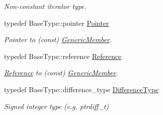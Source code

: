 \begin{DoxyCompactItemize}
\begin{DoxyCompactList}\small\item\em Non-\/constant iterator type. \end{DoxyCompactList}\item 
\mbox{\label{classGenericMemberIterator_ac69f141f1fde31c1f550f524a69c5de9}} 
typedef Base\+Type\+::pointer \hyperlink{classGenericMemberIterator_ac69f141f1fde31c1f550f524a69c5de9}{Pointer}
\begin{DoxyCompactList}\small\item\em Pointer to (const) \hyperlink{structGenericMember}{Generic\+Member}. \end{DoxyCompactList}\item 
\mbox{\label{classGenericMemberIterator_ae80f6b601eb9e24f73aa75fb32b35c65}} 
typedef Base\+Type\+::reference \hyperlink{classGenericMemberIterator_ae80f6b601eb9e24f73aa75fb32b35c65}{Reference}
\begin{DoxyCompactList}\small\item\em \hyperlink{structReference}{Reference} to (const) \hyperlink{structGenericMember}{Generic\+Member}. \end{DoxyCompactList}\item 
\mbox{\label{classGenericMemberIterator_a902b99c8ae351cd7626514dc5f30740a}} 
typedef Base\+Type\+::difference\+\_\+type \hyperlink{classGenericMemberIterator_a902b99c8ae351cd7626514dc5f30740a}{Difference\+Type}
\begin{DoxyCompactList}\small\item\em Signed integer type (e.\+g. {\ttfamily ptrdiff\+\_\+t}) \end{DoxyCompactList}\end{DoxyCompactItemize}
